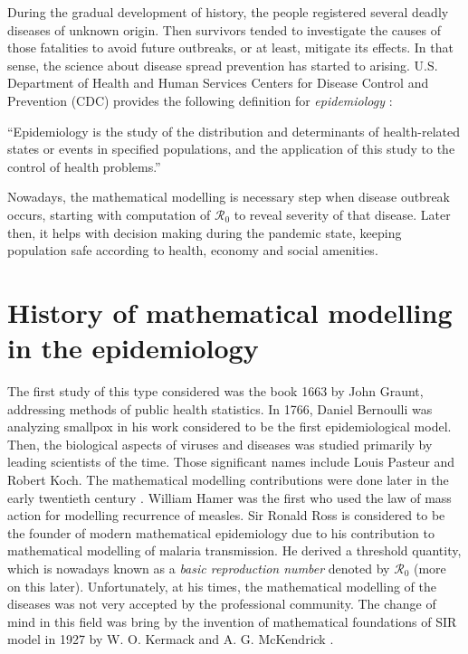 \documentclass[
  digital, %
  oneside, %
  lof,     %
  lot,     %
]{fithesis4}
\begin{document}
During the gradual development of history,
the people registered several deadly diseases of unknown origin.
Then survivors tended to investigate the causes of those 
fatalities to avoid future outbreaks, or at least, mitigate its effects.
In that sense, the science about disease spread 
prevention has started to arising.
U.S. Department of Health and Human Services Centers 
for Disease Control and Prevention (CDC) provides the 
following definition for \textit{epidemiology} \cite{cdc2006}:

\begin{displayquote}
  ``Epidemiology is the study of the distribution and
  determinants of health-related states or events in specified
  populations, and the application of this study to the control
  of health problems.''
\end{displayquote}

Nowadays, the mathematical modelling is necessary 
step when disease outbreak occurs, starting with computation 
of $\mathcal{R}_0$ to reveal severity of that disease.
Later then, it helps with decision 
making during the pandemic state, keeping population safe 
according to health, economy and social amenities.

\section{History of mathematical modelling in the epidemiology}

The first study of this type considered was the book 1663 by 
John Graunt, addressing methods of public health statistics.
In 1766, Daniel Bernoulli was analyzing smallpox in his work 
considered to be the first epidemiological model.
Then, the biological aspects of viruses and diseases was 
studied primarily by leading scientists of the time.
Those significant names include Louis Pasteur and Robert Koch.
The mathematical modelling contributions were done later in
the early twentieth century \cite[Chapter~1.4]{martcheva2015}.
William Hamer was the first who used the law of 
mass action for modelling recurrence of measles. 
Sir Ronald Ross is considered to be the founder of 
modern mathematical epidemiology due to his contribution
to mathematical modelling of malaria
transmission. He derived a threshold quantity, which is 
nowadays known as a \textit{basic reproduction number}
denoted by $\mathcal{R}_0$ (more on this later).
Unfortunately, at his times, the mathematical modelling 
of the diseases was not very accepted by the professional community.
The change of mind in this field was bring by the invention 
of mathematical foundations of SIR model in 1927 by W. O. Kermack and 
A. G. McKendrick \cite{kermack1927}.
\end{document}
